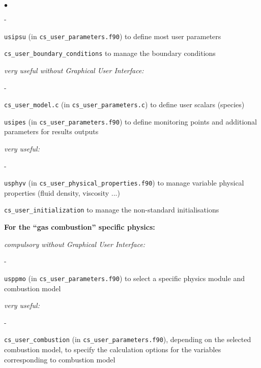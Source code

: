 {{{{{\begin{list}{$\bullet$}{}
\begin{list}{}{}
\begin{list}{}{}
\begin{list}{-}{}
            \item \texttt{usipsu} (in \texttt{cs\_user\_parameters.f90}) to
              define most user parameters

            \item \texttt{cs\_user\_boundary\_conditions} to manage the boundary conditions
        \end{list}

        \item {\em  very useful without Graphical User Interface:}
        \begin{list}{-}{}
            \item \texttt{\texttt{cs\_user\_model.c}}
              (in \texttt{cs\_user\_parameters.c}) to
              define user scalars (species)

            \item \texttt{usipes} (in \texttt{cs\_user\_parameters.f90}) to
              define monitoring points and additional parameters for results outputs
        \end{list}

        \item {\em  very useful:}
        \begin{list}{-}{}
            \item \texttt{usphyv} (in
              \texttt{cs\_user\_physical\_properties.f90}) to manage variable physical
                  properties (fluid density, viscosity ...)

            \item \texttt{cs\_user\_initialization} to manage the non-standard initialisations
        \end{list}
    \end{list}

  \item{\bf For the ``gas combustion'' specific physics:}

    \begin{list}{}{}
        \item {\em compulsory without Graphical User Interface:}
        \begin{list}{-}{}
            \item \texttt{usppmo} (in \texttt{cs\_user\_parameters.f90})
               to select a specific physics module and combustion model
        \end{list}

        \item {\em very useful:}
        \begin{list}{-}{}
            \item  \texttt{cs\_user\_combustion}
                   (in \texttt{cs\_user\_parameters.f90}),
                   depending on the selected combustion model,
                   to specify the calculation options
                   for the variables
                   corresponding to combustion model
        \end{list}
    \end{list}


\end{list}
\end{list}}}}}}
